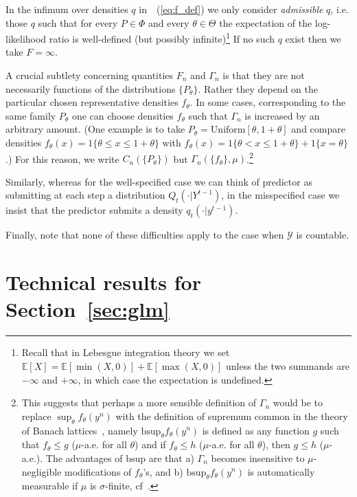 \documentclass[12pt]{colt2021} %
\theoremstyle{remark}
\newcommand{\eqref}[1]{~(\ref{#1})}
\def\EE{\Expect}
\newcommand{\Unif}{\mathrm{Uniform}}
\newcommand{\Expect}{\mathbb{E}}
\newcommand{\calY}{{\mathcal{Y}}}
\begin{document}
In the infimum over densities $q$ in~\eqref{eq:f_def} we only consider \textit{admissible} $q$, i.e. those $q$ 
such that for every $P\in \Phi$ and every $\theta \in \Theta$ the expectation of the
log-likelihood ratio is well-defined (but possibly infinite)\footnote{Recall
that in Lebesgue integration theory we set $\EE[X] =
\EE[\min(X,0)]+\EE[\max(X,0)]$ unless the two summands are $-\infty$ and
$+\infty$, in which case the expectation is undefined.} If no such $q$ exist
then we take $F=\infty$.

A crucial subtlety concerning quantities $F_n$ and $\Gamma_n$ is that they are
not necessarily functions of the distributions $\{P_\theta\}$.  Rather they
depend on the particular chosen representative densities $f_\theta$. 
In some cases, corresponding to the same family $P_\theta$ one can
choose densities $f_\theta$ such that $\Gamma_n$ is increased by an arbitrary
amount. (One example is to take $P_\theta = \Unif[\theta, 1+\theta]$ and
compare densities $f_\theta(x)= 1\{\theta \le x \le 1+\theta\}$ with
$f_\theta(x) = 1\{\theta < x \le 1+\theta\} + 1\{x=\theta\}$.) For this reason,
we write $C_n(\{P_\theta\})$ but $\Gamma_n(\{f_\theta\}, \mu)$.\footnote{This suggests that perhaps a more 
sensible definition of $\Gamma_n$ would be to replace $\sup_\theta f_\theta(y^n)$ with the
definition of supremum common in the theory of Banach lattices~\cite[Section 2.6]{meyer2012banach}, namely
$\textrm{bsup}_\theta f_\theta(y^n)$ is defined as any function $g$ such that $f_\theta \le g$ ($\mu$-a.e. for all
$\theta$) and if $f_\theta \le h$ ($\mu$-a.e. for all $\theta$), 
then $g\le h$ ($\mu$-a.e.).  The advantages of $\mathrm{bsup}$ are that a) $\Gamma_n$ becomes insensitive to 
$\mu$-negligible modifications of $f_\theta$'s, and b)
$\mathrm{bsup}_\theta f_\theta(y^n)$ is automatically measurable if $\mu$ is $\sigma$-finite, cf~\cite[Lemma 2.6.1]{meyer2012banach}.}

Similarly, whereas for the well-specified case we can think of predictor as submitting at each step 
a distribution $Q_t(\cdot | Y^{t-1})$, in the misspecified case we insist that the predictor submits a density $q_t(\cdot|y^{t-1})$. 

Finally, note that none of these difficulties apply to the case when $\calY$ is countable.

\section{Technical results for Section~\ref{sec:glm}}\label{app:logz}
\end{document}

